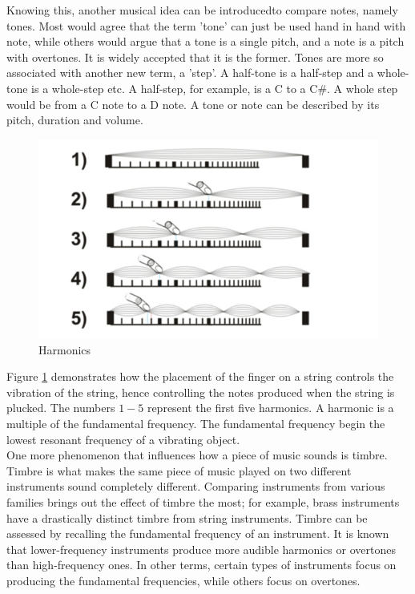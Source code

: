 \documentclass[12pt,a4paper]{article}
\begin{document}
	Knowing this, another musical idea can be introducedto compare notes, namely tones. 
	Most would agree that the term 'tone' can just be used hand in hand with note, while others would argue that a tone is a single pitch, and a note is a pitch with overtones. 
	It is widely accepted that it is the former. 
	Tones are more so associated with another new term, a 'step'.
	A half-tone is a half-step and a whole-tone is a whole-step etc. 
	A half-step, for example, is a C to a C\#.
	A whole step would be from a C note to a D note.
	A tone or note can be described by its pitch, duration and volume.
\newpage
\vspace*{5mm}
\begin{figure}[h]
	\begin{center}
		\includegraphics[width=0.7\linewidth]{Harmonics}
	\end{center}
	\caption{Harmonics}
	\label{fig:HARMONICS}	
\end{figure}
	Figure \ref{fig:HARMONICS} demonstrates how the placement of the finger on a string controls the vibration of the string, hence controlling the notes produced when the string is plucked. The numbers $1-5$ represent the first five 
	harmonics. A harmonic is a multiple of the fundamental frequency. The fundamental frequency begin the lowest
	resonant frequency of a vibrating object.\\
	One more phenomenon that influences how a piece of music sounds is timbre. Timbre is what makes the same piece
	of music played on two different instruments sound completely different. Comparing instruments from various families brings out the effect of timbre the most; for example, brass instruments have a drastically distinct timbre from string instruments. 
	Timbre can be assessed by recalling the fundamental frequency of an instrument.
	It is known that lower-frequency instruments produce more audible harmonics or overtones than high-frequency ones. In other terms, certain types of instruments focus on producing the fundamental frequencies, while others focus on overtones.\\
\end{document}
